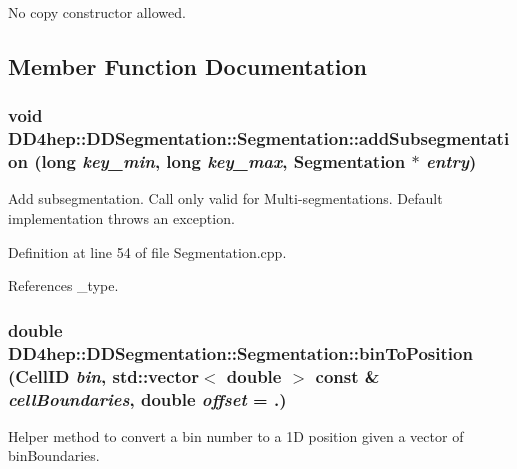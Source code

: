 No copy constructor allowed. 

\subsection{Member Function Documentation}
\hypertarget{class_d_d4hep_1_1_d_d_segmentation_1_1_segmentation_a881469fb51d55c2119e0a94672cb62da}{
\subsubsection[{addSubsegmentation}]{\setlength{\rightskip}{0pt plus 5cm}void DD4hep::DDSegmentation::Segmentation::addSubsegmentation (long {\em key\_\-min}, \/  long {\em key\_\-max}, \/  {\bf Segmentation} $\ast$ {\em entry})}}
\label{class_d_d4hep_1_1_d_d_segmentation_1_1_segmentation_a881469fb51d55c2119e0a94672cb62da}


Add subsegmentation. Call only valid for Multi-\/segmentations. Default implementation throws an exception. 

Definition at line 54 of file Segmentation.cpp.

References \_\-type.\hypertarget{class_d_d4hep_1_1_d_d_segmentation_1_1_segmentation_aeb5bfa97c90cefa129ad0c5d2dcb94fc}{
\subsubsection[{binToPosition}]{\setlength{\rightskip}{0pt plus 5cm}double DD4hep::DDSegmentation::Segmentation::binToPosition ({\bf CellID} {\em bin}, \/  std::vector$<$ double $>$ const \& {\em cellBoundaries}, \/  double {\em offset} = {.})}}
\label{class_d_d4hep_1_1_d_d_segmentation_1_1_segmentation_aeb5bfa97c90cefa129ad0c5d2dcb94fc}


Helper method to convert a bin number to a 1D position given a vector of binBoundaries. 

